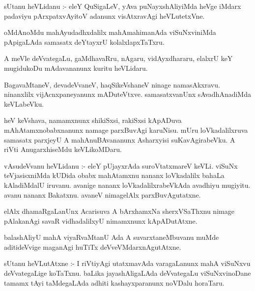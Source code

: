 \documentclass{article}
\begin{document}
\begin{mn}
sUtanu heVLidanu :- eleY QuSigaLeV, yAva puNayxshAliyiMda heVge iMdarx 
padaviyu pArxpatxvAyitoV adanunx visAtxravAgi heVLutetxVne.
\end{mn}

\begin{mn}
oMdAnoMdu mahAyudadhxdalilx mahAmahimanAda viSuNxviniMda pApigaLAda 
samasatx deYtayxrU kolalxlapxTaTxru.
\end{mn}

\begin{mn}
A meVle deVvategaLu, gaMdhavaRru, nAgaru, vidAyxdhararu, elalxrU keY 
mugidukoDu mAdavananunx kuritu heVLidaru.
\end{mn}

\begin{mn}
BagavaMtaneV, devadeVvaneV, haqSikeVshaneV ninage namasAkxravu. ninanxlilx 
vijAcnxpaneyanunx mADuteVtxve.  samasatxvanUnx sAvadhAnadiMda keVLabeVku.
\end{mn}

\begin{mn}
heV keVshava, namamxnunx shikiSxsi, rakiSxsi kApADuva mAhAtamxnobabxnanunx
namage parxBuvAgi karuNisu. mUru loVkadalilxruva samasatx parxjeyU 
A mahAnuBAvananunx Asharxyisi suKavAgirabeVku.  A riVti AnugarxhiseMdu keVLikoMDaru.
\end{mn}

\begin{mn}
vAsudeVvanu heVLidanu :- eleY pUjayxrAda suroVtatxmareV keVLi. 
viSuNx teVjasisxniMda kUDida obabx mahAtamxnu nananx loVkadalilx bahaLa 
kAladiMdalU iruvanu. avanige nananx loVkadalilxrabeVkAda avadhiyu 
mugiyitu. avanu nananx Bakatxnu. avaneV nimagelAlx  parxBuvAgutatxne.
\end{mn}

\begin{mn}
elAlx dhamaRgaLanUnx Acarisuva A bArxhamxNa sherxVSaThxnu  nimage pAlakanAgi
savaR vidhadalilxyU nimamxnunx kApADutAtxne.
\end{mn}

\begin{mn}
balashAliyU mahA viyaRvaMtanU Ada A suvarxtaneMbuvanu muMde aditideVvige 
maganAgi huTiTx  deVveVMdarxnAgutAtxne.
\end{mn}

\begin{mn}
sUtanu heVLutAtxne :- I riVtiyAgi utatxmavAda varagaLanunx mahA viSuNxvu 
deVvategaLige koTaTxnu. baLika jayashAligaLAda deVvategaLu viSuNxvinoDane 
tamamx tAyi taMdegaLAda adhiti kashayxparanunx noVDalu horaTaru.
\end{mn}
\end{document}
